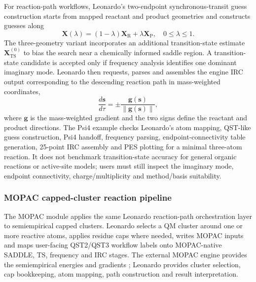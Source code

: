 \documentclass[pdflatex,sn-vancouver-num]{sn-jnl}
\begin{document}
For reaction-path workflows, Leonardo's two-endpoint synchronous-transit guess construction starts from mapped reactant and product geometries and constructs guesses along
\begin{equation}
\mathbf{X}(\lambda)=(1-\lambda)\mathbf{X}_\mathrm{R}+\lambda\mathbf{X}_\mathrm{P}, \quad 0 \leq \lambda \leq 1 .
\end{equation}
The three-geometry variant incorporates an additional transition-state estimate $\mathbf{X}_\mathrm{TS}^{(0)}$ to bias the search near a chemically informed saddle region.  A transition-state candidate is accepted only if frequency analysis identifies one dominant imaginary mode.  Leonardo then requests, parses and assembles the engine IRC output corresponding to the descending reaction path in mass-weighted coordinates,
\begin{equation}
\frac{d\mathbf{s}}{d\tau}=\pm \frac{\mathbf{g}(\mathbf{s})}{\left\|\mathbf{g}(\mathbf{s})\right\|},
\end{equation}
where $\mathbf{g}$ is the mass-weighted gradient and the two signs define the reactant and product directions.  The Psi4 example checks Leonardo's atom mapping, QST-like guess construction, Psi4 handoff, frequency parsing, endpoint-connectivity table generation, 25-point IRC assembly and PES plotting for a minimal three-atom reaction.  It does not benchmark transition-state accuracy for general organic reactions or active-site models; users must still inspect the imaginary mode, endpoint connectivity, charge/multiplicity and method/basis suitability.

\subsubsection{MOPAC capped-cluster reaction pipeline}

The MOPAC module applies the same Leonardo reaction-path orchestration layer to semiempirical capped clusters.  Leonardo selects a QM cluster around one or more reactive atoms, applies residue caps where needed, writes MOPAC inputs and maps user-facing QST2/QST3 workflow labels onto MOPAC-native SADDLE, TS, frequency and IRC stages.  The external MOPAC engine provides the semiempirical energies and gradients \cite{mopac1990,mopac_joss2026}; Leonardo provides cluster selection, cap bookkeeping, atom mapping, path construction and result interpretation.
\end{document}
